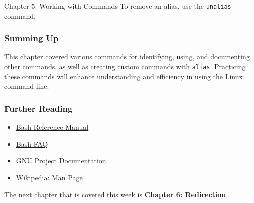 \begin{notes}{Chapter 5: Working with Commands}
    To remove an alias, use the \texttt{unalias} command.

    \begin{highlight}
    \end{highlight}

    \subsubsection*{Summing Up}

    This chapter covered various commands for identifying, using, and documenting other commands, as well as creating custom commands with \texttt{alias}. Practicing these commands will enhance 
    understanding and efficiency in using the Linux command line.

    \subsubsection*{Further Reading}

    \begin{itemize}
        \item \href{http://www.gnu.org/software/bash/manual/bashref.html}{Bash Reference Manual}
        \item \href{http://mywiki.wooledge.org/BashFAQ}{Bash FAQ}
        \item \href{http://www.gnu.org/manual/manual.html}{GNU Project Documentation}
        \item \href{http://en.wikipedia.org/wiki/Man_page}{Wikipedia: Man Page}
    \end{itemize}
\end{notes}

The next chapter that is covered this week is \textbf{Chapter 6: Redirection}

